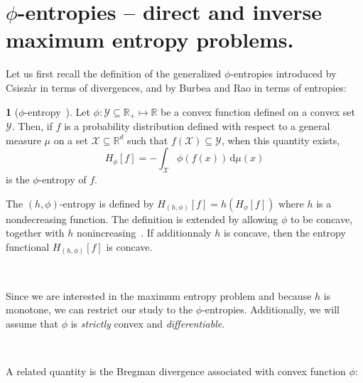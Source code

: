 \documentclass[english,sort&compress]{elsarticle}
\theoremstyle{definition}
\newtheorem{defn}{\protect\definitionname}
\theoremstyle{plain}
\theoremstyle{plain}
\providecommand{\definitionname}{Definition}
\def\dmu{\mathrm{d}\mu}
\def\Rset{\mathbb{R}}
\def\X{\mathcal{X}}
\def\Y{\mathcal{Y}}
\begin{document}
\section{$\phi$-entropies -- direct and inverse maximum entropy problems.}
\label{sec:MaxPhiEnt}

Let  us  first  recall  the   definition  of  the  generalized  $\phi$-entropies
introduced by Csisz\`ar in terms of divergences,  and by Burbea and Rao in terms
of entropies:


\begin{defn}[$\phi$-entropy~\cite{BurRao82}]
\label{def:phi-entropy}
Let $\phi: \Y \subseteq \Rset_+ \mapsto \Rset$ be a convex function defined on a
convex  set $\Y$.   Then,  if $f$  is  a probability  distribution defined  with
respect to  a general measure  $\mu$ on a  set $\X \subseteq \Rset^d$  such that
$f(\X) \subseteq \Y$, when this quantity exists,
  \begin{equation}\label{eq:phi-entropy}
    H_{\phi}[f] = - \int_\X \phi(f(x)) \, \dmu(x)
  \end{equation}
  is  the $\phi$-entropy  of  $f$.
\end{defn}
%
The $(h,\phi)$-entropy is defined by $H_{(h,\phi)}[f] = h\left(H_\phi[f]\right)$
where $h$ is a nondecreasing function. The definition is extended by allowing
$\phi$ to be concave, together with $h$ nonincreasing~\cite{Csi67, SalMen93,
 Sal94, MenMor97, Par06}. If additionnaly $h$ is concave, then the entropy
functional $H_{(h,\phi)}[f]$ is concave.

\

Since we are interested in the maximum entropy problem and
because $h$ is monotone, we can restrict our study to the $\phi$-entropies.
Additionally, we will assume that $\phi$ is {\em strictly} convex and {\em
 differentiable}.

\

A related quantity is the Bregman divergence
associated with convex function $\phi$:
\end{document}
